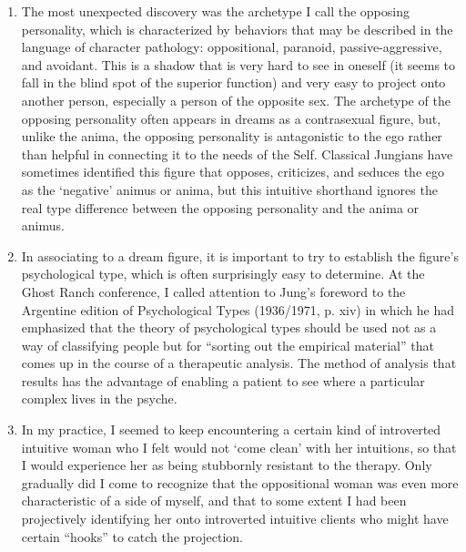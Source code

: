 \begin{enumerate}
    \item {} The most unexpected discovery was the archetype I
        call the opposing personality, which is characterized by behaviors that
        may be described in the language of character pathology: oppositional,
        paranoid, passive-aggressive, and avoidant. This is a shadow that is
        very hard to see in oneself (it seems to fall in the blind spot of the
        superior function) and very easy to project onto another person,
        especially a person of the opposite sex. The archetype of the opposing
        personality often appears in dreams as a contrasexual figure, but,
        unlike the anima, the opposing personality is antagonistic to the ego
        rather than helpful in connecting it to the needs of the Self.
        Classical Jungians have sometimes identified this figure that opposes,
        criticizes, and seduces the ego as the ‘negative’ animus or anima, but
        this intuitive shorthand ignores the real type difference between the
        opposing personality and the anima or animus.

    \item {} In associating to a dream figure, it is important to try to
        establish the figure’s psychological type, which is often surprisingly
        easy to determine. At the Ghost Ranch conference, I called attention to
        Jung’s foreword to the Argentine edition of Psychological Types
        (1936/1971, p.  xiv) in which he had emphasized that the theory of
        psychological types should be used not as a way of classifying people
        but for “sorting out the empirical material” that comes up in the
        course of a therapeutic analysis. The method of analysis that results
        has the advantage of enabling a patient to see where a particular
        complex lives in the psyche.

    \item {} In my practice, I seemed to keep
        encountering a certain kind of introverted intuitive woman who I felt
        would not ‘come clean’ with her intuitions, so that I would experience
        her as being stubbornly resistant to the therapy. Only gradually did I
        come to recognize that the oppositional woman was even more
        characteristic of a side of myself, and that to some extent I had been
        projectively identifying her onto introverted intuitive clients who
        might have certain “hooks” to catch the projection.


\end{enumerate}

